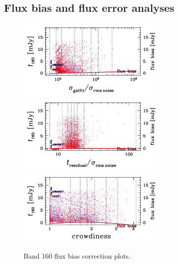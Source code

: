 \documentclass[11pt,a4paper]{article}
\begin{document}
\subsection{Flux bias and flux error analyses}
\label{Band160_simanalyses}

\begin{figure}[H]
	\caption{
		Band 160 flux bias correction plots.
	}
	\includegraphics[width=0.65\textwidth]{galsim_160_fbias_1}
	\includegraphics[width=0.65\textwidth]{galsim_160_fbias_2}
	\includegraphics[width=0.65\textwidth]{galsim_160_fbias_3}
\end{figure}
\end{document}

